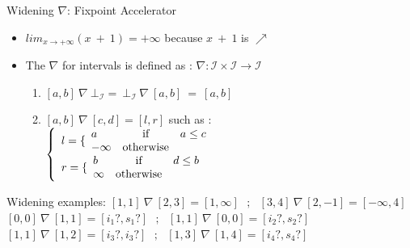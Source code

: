 \begin{frame}{Widening $\nabla$: Fixpoint Accelerator}
\begin{itemize}
	\item $lim_{x\to +\infty} (x ~+~1) = +\infty$ because $x~+~1$ is $\nearrow$
	\item The $\nabla$  for intervals is defined as : $\nabla : \mathcal{I} \times \mathcal{I} \rightarrow \mathcal{I}$\\
	\begin{enumerate}
	\item $[a,b] ~\nabla ~\bot_\mathcal{I}= ~\bot_\mathcal{I} ~\nabla~ [a,b]~ = ~[a,b]  $
	\item$[a,b] ~\nabla ~[c,d]= [l,r]$ such as : \\   
$	\left\{ \begin{array}{l}
	l = \{ \begin{array}{l c r} a & \mbox{if} & a \leq c
	\\  -\infty & \mbox{otherwise} &  \end{array}\\
	r = \{ \begin{array}{l c r} b & \mbox{if} & d \leq b
	\\  \infty & \mbox{otherwise} & \\ \end{array}\\
	\end{array}\right.$
	\end{enumerate}

\end{itemize}		
		\begin{exampleblock}{Widening examples:}
		$[1,1]~\nabla~[2,3]=[1,\infty] ~~~;~~~[3,4]~\nabla~[2,-1]=[-\infty,4]$\\
		$[0,0]~\nabla~[1,1]=[i_1?,s_1?] ~~~;~~~[1,1]~\nabla~[0,0]=[i_2?,s_2?]$\\
		$[1,1]~\nabla~[1,2]=[i_3?,i_3?] ~~~;~~~[1,3]~\nabla~[1,4]=[i_4?,s_4?]$\\
	\end{exampleblock}
	


\end{frame}



